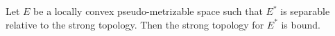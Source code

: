 Let $E$ be a locally convex pseudo-metrizable space such that $E^{*}$ is separable relative to the strong topology. Then the strong topology for $E^{*}$ is bound.
